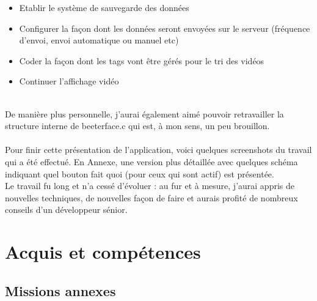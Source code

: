 \documentclass[11pt,french,a4paper]{report}
\begin{document}
\begin{itemize}
    \item Etablir le système de sauvegarde des données
    \item Configurer la façon dont les données seront envoyées sur le serveur (fréquence d'envoi, envoi automatique ou manuel etc) 
    \item Coder la façon dont les tags vont être  gérés pour le tri des vidéos 
    \item Continuer l'affichage vidéo
\end{itemize} 
\\
De manière plus personnelle, j'aurai également aimé pouvoir retravailler la structure interne de beeterface.c qui est, à mon sens,
un peu brouillon. \\
\\
Pour finir cette présentation de l'application, voici quelques screenshots du travail qui a été effectué. En Annexe, une version plus
détaillée avec quelques schéma indiquant quel bouton fait quoi (pour ceux qui sont actif) est présentée. \\
Le travail fu long et n'a cessé d'évoluer : au fur et à mesure, j'aurai appris de nouvelles techniques, de nouvelles façon de faire 
et aurais profité de nombreux conseils d'un développeur sénior. \\


\chapter{Acquis et compétences}
    \section{Missions annexes}
\end{document}
